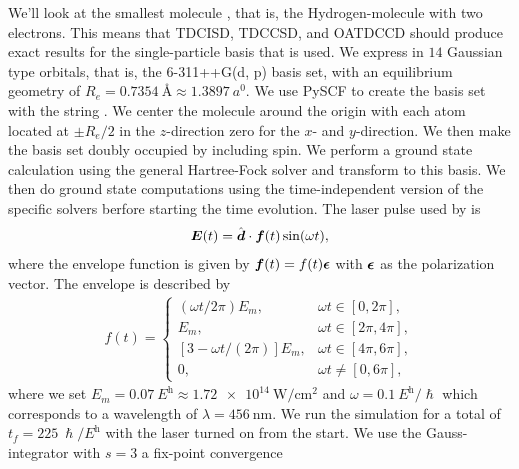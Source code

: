         We'll look at the smallest molecule , that is, the
        Hydrogen-molecule with two electrons.
        This means that TDCISD, TDCCSD, and OATDCCD should produce exact
        results for the single-particle basis that is used.
        We express  in $14$ Gaussian type orbitals, that is, the
        6-311++G(d, p) basis set, with an equilibrium geometry of $R_e =
        \SI{0.7354}{\angstrom} \approx \SI{1.3897}{\bohr}$.
        We use PySCF \cite{pyscf} to create the basis set with the string
        .
        We center the molecule around the origin with each atom located at
        $\pm R_e/2$ in the $z$-direction zero for the $x$- and
        $y$-direction.
        We then make the basis set doubly occupied by including spin.
        We perform a ground state calculation using the general Hartree-Fock
        solver and transform to this basis.
        We then do ground state computations using the time-independent version
        of the specific solvers berfore starting the time evolution.
        The laser pulse used by \citeauthor{li_2005} is
        \begin{align}
            \boldsymbol{E}(t)
            = \hat{\boldsymbol{d}} \cdot \boldsymbol{f}(t)\sin(\omega t),
            \label{eq:li-field}
        \end{align}
        where the envelope function is given by $\boldsymbol{f}(t) =
        f(t)\boldsymbol{\epsilon}$ with $\boldsymbol{\epsilon}$ as the polarization vector.
        The envelope is described by
        \begin{align}
            f(t) = \begin{cases}
                (\omega t / 2\pi) E_m, & \omega t \in [0, 2\pi], \\
                E_m, & \omega t \in [2\pi, 4\pi], \\
                [3 - \omega t / (2\pi)] E_m, & \omega t \in [4\pi, 6\pi], \\
                0, & \omega t \neq [0, 6\pi],
            \end{cases}
            \label{eq:li-laser}
        \end{align}
        where we set $E_m = \SI{0.07}{\hartree} \approx
        \SI{1.72e14}{\watt/\cm^2}$ and $\omega =
        \SI{0.1}{\hartree/\hslash}$ which corresponds to a wavelength of
        $\lambda = \SI{456}{\nano\meter}$.
        We run the simulation for a total of $t_f = \SI{225}{\hslash/\hartree}$
        with the laser turned on from the start.
        We use the Gauss-integrator with $s = 3$ a fix-point convergence
